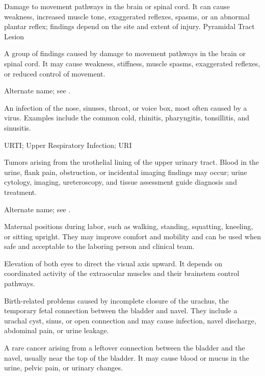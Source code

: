  Damage to movement pathways in the brain or spinal cord. It can cause weakness, increased muscle tone, exaggerated reflexes, spasms, or an abnormal plantar reflex; findings depend on the site and extent of injury.
\synonyms
Pyramidal Tract Lesion

 A group of findings caused by damage to movement pathways in the brain or spinal cord. It may cause weakness, stiffness, muscle spasms, exaggerated reflexes, or reduced control of movement.

 Alternate name; see .

 An infection of the nose, sinuses, throat, or voice box, most often caused by a virus. Examples include the common cold, rhinitis, pharyngitis, tonsillitis, and sinusitis.

\synonyms
URTI; Upper Respiratory Infection; URI

 Tumors arising from the urothelial lining of the upper urinary tract. Blood in the urine, flank pain, obstruction, or incidental imaging findings may occur; urine cytology, imaging, ureteroscopy, and tissue assessment guide diagnosis and treatment.

 Alternate name; see .

 Maternal positions during labor, such as walking, standing, squatting, kneeling, or sitting upright.
They may improve comfort and mobility and can be used when safe and acceptable to the
laboring person and clinical team.

 Elevation of both eyes to direct the visual axis upward. It depends on coordinated activity of the extraocular muscles and their brainstem control pathways.

 Birth-related problems caused by incomplete closure of the urachus, the temporary fetal connection between the bladder and navel. They include a urachal cyst, sinus, or open connection and may cause infection, navel discharge, abdominal pain, or urine leakage.

 A rare cancer arising from a leftover connection between the bladder and the navel, usually near the top of the bladder. It may cause blood or mucus in the urine, pelvic pain, or urinary changes.

